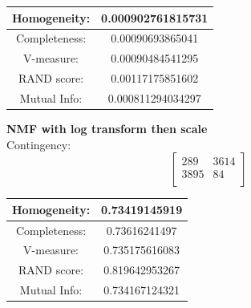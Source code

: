 \documentclass{report}
\begin{document}
\begin{center}
\begin{tabu}{| c | c |}
\hline
Homogeneity: 		& 0.000902761815731 \\
\hline
Completeness: 		& 0.00090693865041 \\
\hline
V-measure: 			& 0.00090484541295  \\
\hline
RAND score: 		& 0.00117175851602  \\
\hline
Mutual Info: 		& 0.000811294034297  \\
\hline
\end{tabu}
\end{center}


\textbf{NMF with log transform then scale}\\

Contingency:\[ 
\begin{bmatrix}
289 		& 3614 \\
3895   		& 84 	\\
\end{bmatrix}
\]

\begin{center}
\begin{tabu}{| c | c |}
\hline
Homogeneity: 		& 0.73419145919 \\
\hline
Completeness:	 	& 0.73616241497 \\
\hline
V-measure: 			& 0.735175616083 \\
\hline
RAND score: 		& 0.819642953267 \\
\hline
Mutual Info: 		& 0.734167124321 \\
\hline 
\end{tabu}
\end{center}
\end{document}
